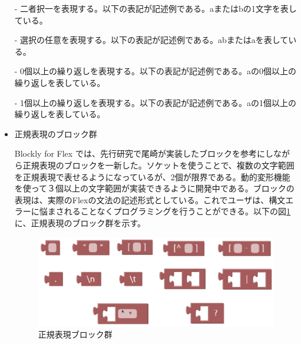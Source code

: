 \documentclass{eniepaper}
\begin{document}
\begin{itemize}
- 二者択一を表現する。以下の表記が記述例である。aまたはbの1文字を表している。


- 選択の任意を表現する。以下の表記が記述例である。abまたはaを表している。


- 0個以上の繰り返しを表現する。以下の表記が記述例である。aの0個以上の繰り返しを表している。


- 1個以上の繰り返しを表現する。以下の表記が記述例である。aの1個以上の繰り返しを表している。


\item 正規表現のブロック群

Blockly for Flex では、先行研究で尾崎が実装したブロックを参考にしながら正規表現のブロックを一新した。ソケットを使うことで、複数の文字範囲を正規表現で表せるようになっているが、2個が限界である。動的変形機能を使って３個以上の文字範囲が実装できるように開発中である。ブロックの表現は、実際のFlexの文法の記述形式としている。これでユーザは、構文エラーに悩まされることなくプログラミングを行うことができる。以下の図\ref{fig:flex_RE_blocks}に、正規表現のブロック群を示す。

\begin{figure}[h]
\begin{center}
\includegraphics[scale=0.5]{img/flex_RE_blocks.eps}
\caption{正規表現ブロック群}%
\label{fig:flex_RE_blocks}
\end{center}%
\end{figure}%

\end{itemize} 
\end{document}
